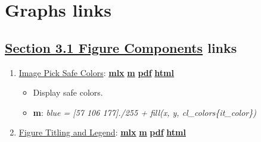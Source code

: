 \documentclass[
]{book}
\providecommand{\tightlist}{%
  \setlength{\itemsep}{0pt}\setlength{\parskip}{0pt}}
\begin{document}
\hypertarget{graphs-links}{%
\section{Graphs links}\label{graphs-links}}

\hypertarget{section-3.1-figure-componentsfigure-components-links}{%
\subsection{\texorpdfstring{\protect\hyperlink{figure-components}{Section 3.1 Figure Components} links}{Section 3.1 Figure Components links}}\label{section-3.1-figure-componentsfigure-components-links}}

\begin{enumerate}
\def\labelenumi{\arabic{enumi}.}
\tightlist
\item
  \href{https://fanwangecon.github.io/M4Econ/graph/tools/htmlpdfm/fs_color.html}{Image Pick Safe Colors}: \href{https://github.com/FanWangEcon/M4Econ/blob/master/graph/tools/fs_color.mlx}{\textbf{mlx}} \textbar{} \href{https://github.com/FanWangEcon/M4Econ/blob/master/graph/tools/htmlpdfm/fs_color.m}{\textbf{m}} \textbar{} \href{https://github.com/FanWangEcon/M4Econ/blob/master/graph/tools/htmlpdfm/fs_color.pdf}{\textbf{pdf}} \textbar{} \href{https://fanwangecon.github.io/M4Econ/graph/tools/htmlpdfm/fs_color.html}{\textbf{html}}

  \begin{itemize}
  \tightlist
  \item
    Display safe colors.
  \item
    \textbf{m}: \emph{blue = {[}57 106 177{]}./255 + fill(x, y, cl\_colors\{it\_color\})}
  \end{itemize}
\item
  \href{https://fanwangecon.github.io/M4Econ/graph/tools/htmlpdfm/fs_titling.html}{Figure Titling and Legend}: \href{https://github.com/FanWangEcon/M4Econ/blob/master/graph/tools/fs_titling.mlx}{\textbf{mlx}} \textbar{} \href{https://github.com/FanWangEcon/M4Econ/blob/master/graph/tools/htmlpdfm/fs_titling.m}{\textbf{m}} \textbar{} \href{https://github.com/FanWangEcon/M4Econ/blob/master/graph/tools/htmlpdfm/fs_titling.pdf}{\textbf{pdf}} \textbar{} \href{https://fanwangecon.github.io/M4Econ/graph/tools/htmlpdfm/fs_titling.html}{\textbf{html}}


\end{enumerate}
\end{document}
